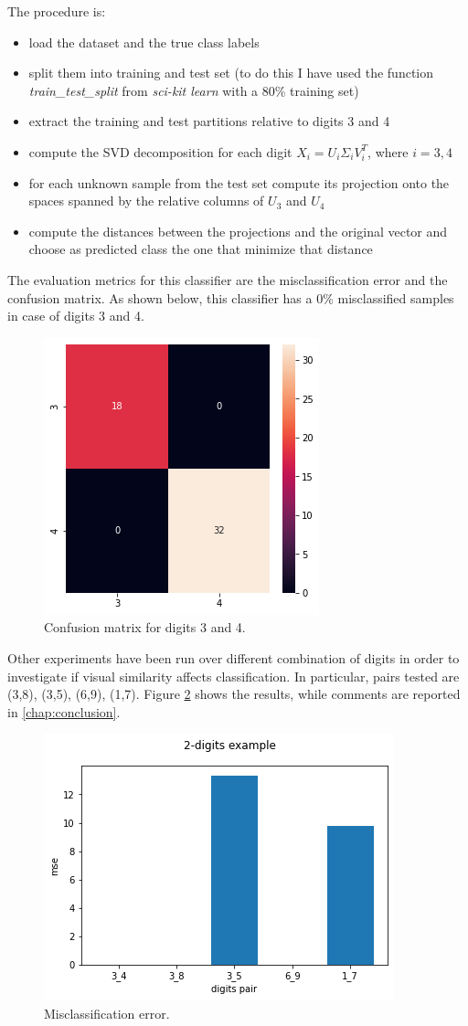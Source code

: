 \documentclass[a4paper,10pt]{report}
\begin{document}
The procedure is:
\begin{itemize}
  \item load the dataset and the true class labels
  \item split them into training and test set (to do this I have used the function \emph{train_test_split} from \emph{sci-kit learn} with a 80\% training set)
  \item extract the training and test partitions relative to digits 3 and 4
  \item compute the SVD decomposition for each digit $X_i = U_i\Sigma_i V^T_i$, where $i=3,4$
  \item for each unknown sample from the test set compute its projection onto the spaces spanned by the relative columns of $U_3$ and $U_4$
  \item compute the distances between the projections and the original vector and choose as predicted class the one that minimize that distance
\end{itemize}
The evaluation metrics for this classifier are the misclassification error and the confusion matrix. 
As shown below, this classifier has a 0\% misclassified samples in case of digits 3 and 4.

\begin{figure}[h]
  \center
  \includegraphics[width=0.45\linewidth]{3_4_cm.png}
  \caption{Confusion matrix for digits 3 and 4.}
  \label{fig:3_4_cm}
\end{figure}

Other experiments have been run over different combination of digits in order to investigate if visual similarity affects classification.
In particular, pairs tested are (3,8), (3,5), (6,9), (1,7).
Figure \ref{fig:binary_cls_mse} shows the results, while comments are reported in \ref{chap:conclusion}.

\begin{figure}[h]
  \center
  \includegraphics[width=0.45\linewidth]{binary_cls_mse.png}
  \caption{Misclassification error.}
  \label{fig:binary_cls_mse}
\end{figure}
\end{document}
